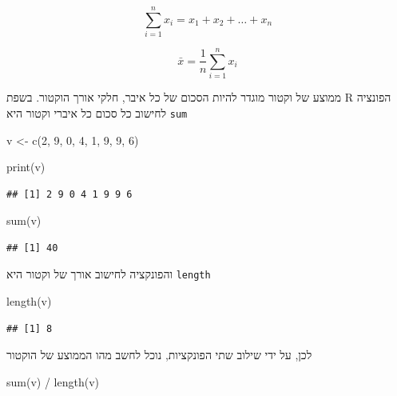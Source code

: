 \documentclass[
]{book}
\newenvironment{Shaded}{\begin{snugshade}}{\end{snugshade}}
\newcommand{\DecValTok}[1]{\textcolor[rgb]{0.00,0.00,0.81}{#1}}
\newcommand{\FunctionTok}[1]{\textcolor[rgb]{0.00,0.00,0.00}{#1}}
\newcommand{\NormalTok}[1]{#1}
\newcommand{\OtherTok}[1]{\textcolor[rgb]{0.56,0.35,0.01}{#1}}
\newcommand{\SpecialCharTok}[1]{\textcolor[rgb]{0.00,0.00,0.00}{#1}}
\begin{document}
\[
\sum_{i=1}^n x_i = x_1 + x_2 + \dots + x_n
\]

\[
\bar x = \frac{1}{n} \sum_{i=1}^n x_i
\]

ממוצע של וקטור מוגדר להיות הסכום של כל איבר, חלקי אורך הוקטור.
בשפת
R
הפונציה לחישוב כל סכום כל איברי וקטור היא
\texttt{sum}

\begin{Shaded}
\begin{Highlighting}[]
\NormalTok{v }\OtherTok{\textless{}{-}} \FunctionTok{c}\NormalTok{(}\DecValTok{2}\NormalTok{, }\DecValTok{9}\NormalTok{, }\DecValTok{0}\NormalTok{, }\DecValTok{4}\NormalTok{, }\DecValTok{1}\NormalTok{, }\DecValTok{9}\NormalTok{, }\DecValTok{9}\NormalTok{, }\DecValTok{6}\NormalTok{)}
\end{Highlighting}
\end{Shaded}

\begin{Shaded}
\begin{Highlighting}[]
\FunctionTok{print}\NormalTok{(v)}
\end{Highlighting}
\end{Shaded}

\begin{verbatim}
## [1] 2 9 0 4 1 9 9 6
\end{verbatim}

\begin{Shaded}
\begin{Highlighting}[]
\FunctionTok{sum}\NormalTok{(v)}
\end{Highlighting}
\end{Shaded}

\begin{verbatim}
## [1] 40
\end{verbatim}

והפונקציה לחישוב אורך של וקטור היא
\texttt{length}

\begin{Shaded}
\begin{Highlighting}[]
\FunctionTok{length}\NormalTok{(v)}
\end{Highlighting}
\end{Shaded}

\begin{verbatim}
## [1] 8
\end{verbatim}

לכן, על ידי שילוב שתי הפונקציות, נוכל לחשב מהו הממוצע של הוקטור

\begin{Shaded}
\begin{Highlighting}[]
\FunctionTok{sum}\NormalTok{(v) }\SpecialCharTok{/} \FunctionTok{length}\NormalTok{(v)}
\end{Highlighting}
\end{Shaded}
\end{document}
